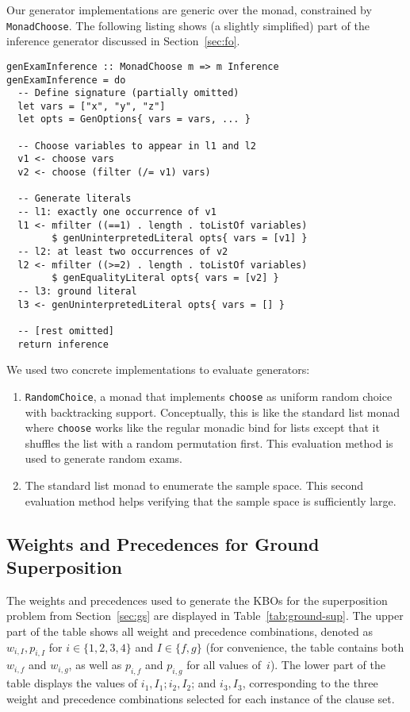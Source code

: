Our generator implementations are generic over the monad, constrained by \texttt{MonadChoose}.
The following listing shows (a slightly simplified) part of the inference generator
discussed in Section~\ref{sec:fo}.
\begin{lstlisting}
genExamInference :: MonadChoose m => m Inference
genExamInference = do
  -- Define signature (partially omitted)
  let vars = ["x", "y", "z"]
  let opts = GenOptions{ vars = vars, ... }

  -- Choose variables to appear in l1 and l2
  v1 <- choose vars
  v2 <- choose (filter (/= v1) vars)

  -- Generate literals
  -- l1: exactly one occurrence of v1
  l1 <- mfilter ((==1) . length . toListOf variables)
        $ genUninterpretedLiteral opts{ vars = [v1] }
  -- l2: at least two occurrences of v2
  l2 <- mfilter ((>=2) . length . toListOf variables)
        $ genEqualityLiteral opts{ vars = [v2] }
  -- l3: ground literal
  l3 <- genUninterpretedLiteral opts{ vars = [] }

  -- [rest omitted]
  return inference
\end{lstlisting}



We used two concrete implementations to evaluate generators:
\begin{enumerate}
    \item
        \texttt{RandomChoice}, a monad that implements \texttt{choose}
        as uniform random choice with backtracking support.
        Conceptually, this is like the standard list monad
        where \texttt{choose} works like the regular monadic bind for lists
        except that it shuffles the list with a random permutation first.
        This evaluation method is used to generate random exams.
    \item
        The standard list monad to enumerate the sample space.
        This second evaluation method helps verifying that the sample space is sufficiently large.
\end{enumerate}

\subsection{Weights and Precedences for Ground Superposition}\label{appB:FO}

The weights and precedences used to generate the KBOs for the superposition problem
from Section~\ref{sec:gs}
are displayed in Table~\ref{tab:ground-sup}.
The upper part of the table shows all weight and precedence combinations,
denoted as $w_{i, I}, p_{i, I}$ for $i \in \{1, 2, 3, 4\}$
and $I \in \{f, g\}$ (for convenience, the table contains both $w_{i, f}$
and $w_{i, g}$, as well as $p_{i, f}$ and $p_{i, g}$ for all values of~$i$).
The lower part of the table displays the values of $i_1, I_1; i_2, I_2$; and $i_3, I_3$,
corresponding to the three weight and precedence combinations selected for
each instance of the clause set.

